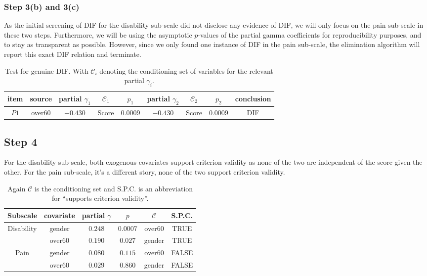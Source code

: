 \documentclass[a4project,12pt]{article}
\theoremstyle{examplestyle}
\theoremstyle{defstyle}
\theoremstyle{thmstyle}
\begin{document}
\subsubsection{Step 3(b) and 3(c)}
As the initial screening of DIF for the disability sub-scale did not disclose any evidence of DIF, we will only focus on the pain sub-scale in these two steps. Furthermore, we will be using the asymptotic $p$-values of the partial gamma coefficients for reproducibility purposes, and to stay as transparent as possible. However, since we only found one instance of DIF in the pain sub-scale, the elimination algorithm will report this exact DIF relation and terminate. %
\begin{table}[H]
    \centering
    \begin{tabular}{c c c c c c c c c}
         item & source & partial $\gamma_1$ & $\mathcal{C}_1$ & $p_1$ & partial $\gamma_2$ & $\mathcal{C}_2$ & $p_2$ & conclusion \\
         \hline
          $P1$   &  over60 &     $-0.430$      &      Score & $0.0009$ &  $-0.430$   &  Score  &  $0.0009$& DIF\\
          \hline
    \end{tabular}
    \caption{Test for genuine DIF. With $\mathcal{C}_i$ denoting the conditioning set of variables for the relevant partial $\gamma_i$.}
    \label{tab:step_3bc_ex}
\end{table}

\subsection{Step 4}
For the disability sub-scale, both exogenous covariates support criterion validity as none of the two are independent of the score given the other. For the pain sub-scale, it's a different story, none of the two support criterion validity. 
\begin{table}[H]
    \centering
    \begin{tabular}{c|c c c c c}
    \hline 
         Subscale  & covariate & partial $\gamma$ & $p$ & $\mathcal{C}$ & S.P.C. \\
         \hline
         Disability &  gender &  $0.248$ &  $0.0007$               &   over60 &    TRUE \\
        & over60 & $0.190$  & $0.027$ & gender & TRUE \\
        \hline
        Pain & gender & $0.080$ & $0.115$  & over60 &   FALSE \\
        &  over60 & $0.029$ & $ 0.860$ & gender&  FALSE \\
        \hline
    \end{tabular}
    \caption{Again $\mathcal{C}$ is the conditioning set and S.P.C. is an abbreviation for ``supports criterion validity''.}
    \label{tab:placeholder}
\end{table}
\end{document}
